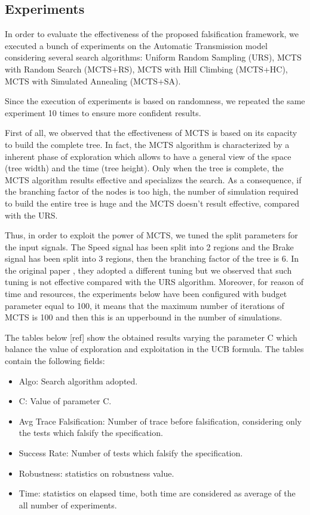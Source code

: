 \documentclass[11pt]{article}
\begin{document}
\pagebreak

\subsection{Experiments}
In order to evaluate the effectiveness of the proposed falsification framework, we executed a bunch of experiments on the Automatic Transmission model considering several search algorithms: Uniform Random Sampling (URS), MCTS with Random Search (MCTS+RS), MCTS with Hill Climbing (MCTS+HC), MCTS with Simulated Annealing (MCTS+SA).

Since the execution of experiments is based on randomness, we repeated the same experiment 10 times to ensure more confident results.

First of all, we observed that the effectiveness of MCTS is based on its capacity to build the complete tree. In fact, the MCTS algorithm is characterized by a inherent phase of exploration which allows to have a general view of the space (tree width) and the time (tree height). Only when the tree is complete, the MCTS algorithm results effective and specializes the search.
As a consequence, if the branching factor of the nodes is too high, the number of simulation required to build the entire tree is huge and the MCTS doesn't result effective, compared with the URS. 

Thus, in order to exploit the power of MCTS, we tuned the split parameters for the input signals. The Speed signal has been split into 2 regions and the Brake signal has been split into 3 regions, then the branching factor of the tree is 6. In the original paper \cite{zhang2018two}, they
adopted a different tuning but we observed that such tuning is not effective compared with the URS algorithm. Moreover, for reason of time and resources, the experiments below have been configured with budget parameter equal to 100, it means that the maximum number of iterations of MCTS is 100 and then this is an upperbound in the number of simulations.

The tables below [ref] show the obtained results varying the parameter C which balance the value of exploration and exploitation in the UCB formula. The tables contain the following fields:
\begin{itemize}
    \item Algo: Search algorithm adopted.
    \item C: Value of parameter C.
    \item Avg Trace Falsification: Number of trace before falsification, considering only the tests which falsify the specification.
    \item Success Rate: Number of tests which falsify the specification.
    \item Robustness: statistics on robustness value.
    \item Time: statistics on elapsed time, both time are considered as average of the all number of experiments.
\end{itemize}
\end{document}

